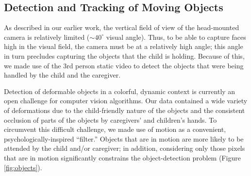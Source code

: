\documentclass[10pt,letterpaper]{article}
\begin{document}
\subsection{Detection and Tracking of Moving Objects}

As described in our earlier work, the vertical field of view of the head-mounted camera is relatively limited ($\sim40^\circ$ visual angle). Thus, to be able to capture faces high in the visual field, the camera must be at a relatively high angle; this angle in turn precludes capturing the objects that the child is holding. Because of this, we made use of the 3rd person static video to detect the objects that were being handled by the child and the caregiver. 



Detection of deformable objects in a colorful, dynamic context is currently an open challenge for computer vision algorithms. Our data contained a wide variety of deformations due to the child-friendly nature of the objects and the consistent occlusion of parts of the objects by caregivers' and children's hands.  To circumvent this difficult challenge, we made use of motion as a convenient, psychologically-inspired ``filter.'' Objects that are in motion are more likely to be attended by the child and/or caregiver; in addition, considering only those pixels that are in motion significantly constrains the object-detection problem (Figure \ref{fig:objects}). 
\end{document}
